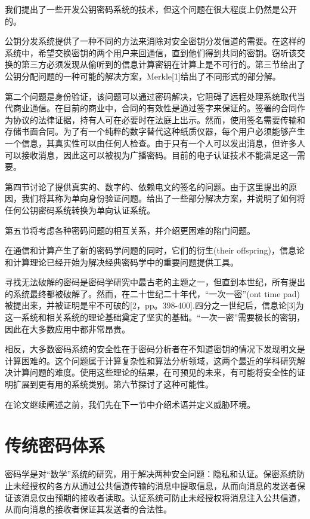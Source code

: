 \documentclass[]{article}
\begin{document}
	我们提出了一些开发公钥密码系统的技术，但这个问题在很大程度上仍然是公开的。
	
	公钥分发系统提供了一种不同的方法来消除对安全密钥分发信道的需要。在这样的系统中，希望交换密钥的两个用户来回通信，直到他们得到共同的密钥。窃听该交换的第三方必须发现从偷听到的信息计算密钥在计算上是不可行的。第三节给出了公钥分配问题的一种可能的解决方案，Merkle[1]给出了不同形式的部分解。
	
	第二个问题是身份验证，该问题可以通过密码解决，它阻碍了远程处理系统取代当代商业通信。在目前的商业中，合同的有效性是通过签字来保证的。签署的合同作为协议的法律证据，持有人可在必要时在法庭上出示。然而，使用签名需要传输和存储书面合同。为了有一个纯粹的数字替代这种纸质仪器，每个用户必须能够产生一个信息，其真实性可以由任何人检查。由于只有一个人可以发出消息，但许多人可以接收消息，因此这可以被视为广播密码。目前的电子认证技术不能满足这一需要。
	
	第四节讨论了提供真实的、数字的、依赖电文的签名的问题。由于这里提出的原因，我们将其称为单向身份验证问题。给出了一些部分解决方案，并说明了如何将任何公钥密码系统转换为单向认证系统。
	
	第五节将考虑各种密码问题的相互关系，并介绍更困难的陷门问题。
	
	在通信和计算产生了新的密码学问题的同时，它们的衍生(their offspring)，信息论和计算理论已经开始为解决经典密码学中的重要问题提供工具。
	
	寻找无法破解的密码是密码学研究中最古老的主题之一，但直到本世纪，所有提出的系统最终都被破解了。然而，在二十世纪二十年代，“一次一密”(ont time pad)被提出来，并被证明是牢不可破的[2，pp。398-400].四分之一世纪后，信息论[3]为这一系统和相关系统的理论基础奠定了坚实的基础。“一次一密”需要极长的密钥，因此在大多数应用中都非常昂贵。
	
	相反，大多数密码系统的安全性在于密码分析者在不知道密钥的情况下发现明文是计算困难的。这个问题属于计算复杂性和算法分析领域，这两个最近的学科研究解决计算问题的难度。使用这些理论的结果，在可预见的未来，有可能将安全性的证明扩展到更有用的系统类别。第六节探讨了这种可能性。
	
	在论文继续阐述之前，我们先在下一节中介绍术语并定义威胁环境。
	
	
	\section{传统密码体系}
	
	密码学是对“数学”系统的研究，用于解决两种安全问题：隐私和认证。保密系统防止未经授权的各方从通过公共信道传输的消息中提取信息，从而向消息的发送者保证该消息仅由预期的接收者读取。认证系统可防止未经授权将消息注入公共信道，从而向消息的接收者保证其发送者的合法性。
	
\end{document}
